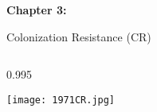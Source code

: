 

\begin{frame}[plain]
    \centering \hspace*{-1cm} \vspace*{-4cm}
        \begin{minipage}{0.8\textwidth}
            \centering
                {\LARGE
                    \textbf{Chapter 3:} \textit{\chapterthree}}
        \end{minipage}
        \vfill
\end{frame}


\begin{frame}{Colonization Resistance (CR)}
    \vspace*{-10mm} %
    \begin{minipage}[t][\usableheight][t]{\usablewidth}
        \begin{columns}[T]  
            \begin{column}{0.995\usablewidth} 
                \begin{block}{\tiny\cite{van_der_waaij_colonization_1971}}
                \centering \vspace*{2mm} %
                    \texttt{[image: 1971CR.jpg]}
                \end{block}
            \end{column}
        \end{columns}
    \end{minipage}
\end{frame}